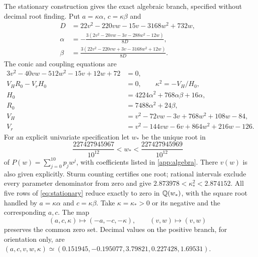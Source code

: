 The stationary construction \cite{Stationary} gives the exact algebraic branch, specified without decimal root finding.
Put $a=\kappa\alpha$, $c=\kappa\beta$ and
\begin{align}
 D&=22v^2-220vw-15v-3168w^2+732w,\nonumber\\
 \alpha&=-\frac{3(2v^2-20vw-3v-288w^2-12w)}{8D},\nonumber\\
 \beta&=\frac{3(22v^2-220vw+3v-3168w^2+12w)}{8D}.
 \label{eq:alphabeta}
\end{align}
The conic and coupling equations are
\begin{align}
 3v^2-40vw-512w^2-15v+12w+72&=0,\nonumber\\
 V_HR_0-V_rH_0&=0,\qquad \kappa^2=-V_H/H_0,\label{eq:conic}\\
 H_0&=4224\alpha^2+768\alpha\beta+16\alpha,\nonumber\\
 R_0&=7488\alpha^2+24\beta,\nonumber\\
 V_H&=v^2-72vw-3v+768w^2+108w-84,\nonumber\\
 V_r&=v^2-144vw-6v+864w^2+216w-126.\nonumber
\end{align}
For an explicit univariate specification let $w_*$ be the unique root in
\begin{equation}
 \frac{227427945967}{10^{12}}<w_*<\frac{227427945969}{10^{12}}
 \label{eq:rootinterval}
\end{equation}
of $P(w)=\sum_{j=0}^{10}p_jw^j$, with coefficients listed in
\cref{app:algebra}. There $v(w)$ is also given explicitly.
Sturm counting certifies one root; rational intervals exclude every
parameter denominator from zero and give
$2.873978<\kappa_*^2<2.874152$.
All five rows of \eqref{eq:stationary} reduce exactly to zero in
$\mathbb Q(w_*)$, with the square root handled by $a=\kappa\alpha$ and
$c=\kappa\beta$. Take $\kappa=\kappa_*>0$ or its negative and the
corresponding $a,c$. The map
\begin{equation}
 (a,c,\kappa)\longmapsto(-a,-c,-\kappa),\qquad (v,w)\longmapsto(v,w)
 \label{eq:mirror}
\end{equation}
preserves the common zero set. Decimal values on the positive branch,
for orientation only, are $(a,c,v,w,\kappa)\simeq
(0.151945,-0.195077,3.79821,0.227428,1.69531)$.


